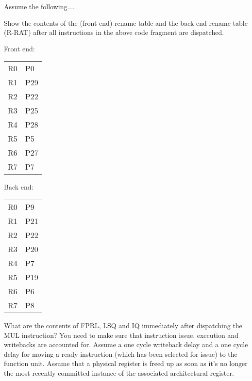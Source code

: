 \documentclass[12pt,letterpaper,twoside]{hmcpset}
\begin{document}
\begin{problem}[3]
 Assume the following....
\end{problem}

\begin{problem}[3a]
 Show the contents of the (front-end) rename table and the back-end rename table (R-RAT) after all instructions in the above code fragment are dispatched.
\end{problem}

\begin{solution}
Front end:
 \begin{center}
\begin{tabular}{l|l}
R0 & P0\\
R1 & P29\\
R2 & P22\\
R3 & P25\\
R4 & P28\\
R5 & P5\\
R6 & P27\\
R7 & P7
 \end{tabular}
 \end{center}

Back end:
 \begin{center}
\begin{tabular}{l|l}
R0 & P9\\
R1 & P21\\
R2 & P22\\
R3 & P20\\
R4 & P7\\
R5 & P19\\
R6 & P6\\
R7 & P8
 \end{tabular}
 \end{center}
\end{solution}

\begin{problem}[3b]
 What are the contents of FPRL, LSQ and IQ immediately after dispatching the MUL instruction?  You need to make sure that instruction issue, execution and writebacks are accounted for.  Assume a one cycle writeback delay and a one cycle delay for moving a ready instruction (which has been selected for issue) to the function unit.  Assume that a physical register is freed up as soon as it's no longer the most recently committed instance of the associated architectural register.
\end{problem}
\end{document}
